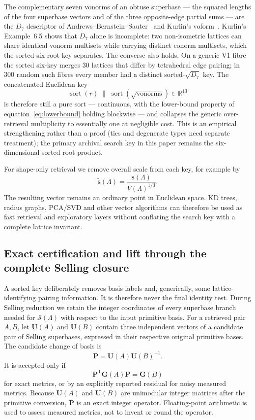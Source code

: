 \documentclass[11pt]{article}
\newcommand{\Gmet}{\mathbf{G}}
\newcommand{\Pop}{\mathbf{P}}
\newcommand{\Uop}{\mathbf{U}}
\newcommand{\sortkey}{\mathbf{s}}
\newcommand{\Sclosure}{\mathcal{S}}
\begin{document}
The complementary seven vonorms of an obtuse superbase --- the squared lengths of the four superbase vectors and of the three opposite-edge partial sums --- are the $D_7$ descriptor of Andrews--Bernstein--Sauter~\cite{abs2019} and Kurlin's voform~\cite{kurlin2026}. Kurlin's Example~6.5 shows that $D_7$ alone is incomplete: two non-isometric lattices can share identical vonorm multisets while carrying distinct conorm multisets, which the sorted six-root key separates. The converse also holds. On a generic V1 fibre the sorted six-key merges 30 lattices that differ by tetrahedral edge pairing; in 300 random such fibres every member had a distinct sorted-$\sqrt{D_7}$ key. The concatenated Euclidean key
\[
\operatorname{sort}(r)\;\big\|\;\operatorname{sort}(\sqrt{\text{vonorms}})
\in\mathbb R^{13}
\]
is therefore still a pure sort --- continuous, with the lower-bound property of equation~\eqref{eq:lowerbound} holding blockwise --- and collapses the generic over-retrieval multiplicity to essentially one at negligible cost. This is an empirical strengthening rather than a proof (ties and degenerate types need separate treatment); the primary archival search key in this paper remains the six-dimensional sorted root product.

For shape-only retrieval we remove overall scale from each key, for example by
\begin{equation}
\tilde{\sortkey}(\Lambda)=\frac{\sortkey(\Lambda)}{V(\Lambda)^{1/3}}.
\end{equation}
The resulting vector remains an ordinary point in Euclidean space. KD trees, radius graphs, PCA/SVD and other vector algorithms can therefore be used as fast retrieval and exploratory layers without conflating the search key with a complete lattice invariant.

\subsection{Exact certification and lift through the complete Selling closure}

A sorted key deliberately removes basis labels and, generically, some lattice-identifying pairing information. It is therefore never the final identity test. During Selling reduction we retain the integer coordinates of every superbase branch needed for $\Sclosure(\Lambda)$ with respect to the input primitive basis. For a retrieved pair $A,B$, let $\Uop(A)$ and $\Uop(B)$ contain three independent vectors of a candidate pair of Selling superbases, expressed in their respective original primitive bases. The candidate change of basis is
\begin{equation}
\Pop = \Uop(A)\Uop(B)^{-1}.
\end{equation}
It is accepted only if
\begin{equation}
\label{eq:metricverify}
\Pop^{\mathsf T}\Gmet(A)\Pop = \Gmet(B)
\end{equation}
for exact metrics, or by an explicitly reported residual for noisy measured metrics. Because $\Uop(A)$ and $\Uop(B)$ are unimodular integer matrices after the primitive conversion, $\Pop$ is an exact integer operator. Floating-point arithmetic is used to assess measured metrics, not to invent or round the operator.
\end{document}
